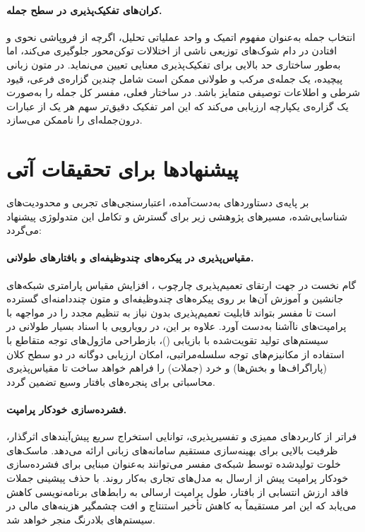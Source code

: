 \paragraph{کران‌های تفکیک‌پذیری در سطح جمله.}
انتخاب جمله به‌عنوان مفهوم اتمیک و واحد عملیاتی تحلیل، اگرچه از فروپاشی نحوی و افتادن در دام شوک‌های توزیعی ناشی از اختلالات توکن‌محور جلوگیری می‌کند، اما به‌طور ساختاری حد بالایی برای تفکیک‌پذیری معنایی تعیین می‌نماید. در متون زبانی پیچیده، یک جمله‌ی مرکب و طولانی ممکن است شامل چندین گزاره‌ی فرعی، قیود شرطی و اطلاعات توصیفی متمایز باشد. در ساختار فعلی، مفسر کل جمله را به‌صورت یک گزاره‌ی یکپارچه ارزیابی می‌کند که این امر تفکیک دقیق‌تر سهم هر یک از عبارات درون‌جمله‌ای را ناممکن می‌سازد.


\section{پیشنهادها برای تحقیقات آتی}\label{sec:6-3}

بر پایه‌ی دستاوردهای به‌دست‌آمده، اعتبارسنجی‌های تجربی و محدودیت‌های شناسایی‌شده، مسیرهای پژوهشی زیر برای گسترش و تکامل این متدولوژی پیشنهاد می‌گردد:

\paragraph{مقیاس‌پذیری در پیکره‌های چندوظیفه‌ای و بافتارهای طولانی.}
گام نخست در جهت ارتقای تعمیم‌پذیری چارچوب ، افزایش مقیاس پارامتری شبکه‌های جانشین و آموزش آن‌ها بر روی پیکره‌های چندوظیفه‌ای و متون چنددامنه‌ای گسترده است تا مفسر بتواند قابلیت تعمیم‌پذیری بدون نیاز به تنظیم مجدد را در مواجهه با پرامپت‌های ناآشنا به‌دست آورد. علاوه بر این، در رویارویی با اسناد بسیار طولانی در سیستم‌های تولید تقویت‌شده با بازیابی ()، بازطراحی ماژول‌های توجه متقاطع با استفاده از مکانیزم‌های توجه سلسله‌مراتبی، امکان ارزیابی دوگانه در دو سطح کلان (پاراگراف‌ها و بخش‌ها) و خرد (جملات) را فراهم خواهد ساخت تا مقیاس‌پذیری محاسباتی برای پنجره‌های بافتار وسیع تضمین گردد.

\paragraph{فشرده‌سازی خودکار پرامپت.}
فراتر از کاربردهای ممیزی و تفسیرپذیری، توانایی استخراج سریع پیش‌آیندهای اثرگذار، ظرفیت بالایی برای بهینه‌سازی مستقیم سامانه‌های زبانی ارائه می‌دهد. ماسک‌های خلوت تولیدشده توسط شبکه‌ی مفسر می‌توانند به‌عنوان مبنایی برای فشرده‌سازی خودکار پرامپت پیش از ارسال به مدل‌های تجاری به‌کار روند. با حذف پیشینی جملات فاقد ارزش انتسابی از بافتار، طول پرامپت ارسالی به رابط‌های برنامه‌نویسی کاهش می‌یابد که این امر مستقیماً به کاهش تأخیر استنتاج و افت چشمگیر هزینه‌های مالی در سیستم‌های بلادرنگ منجر خواهد شد.

